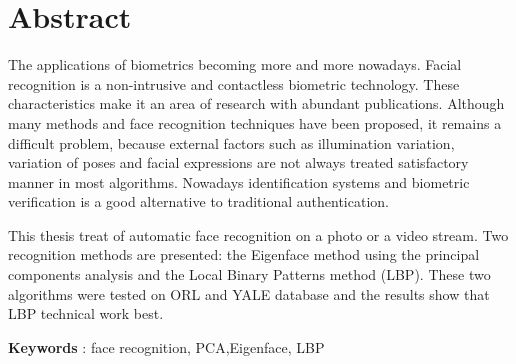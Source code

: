 \chapter*{Abstract}
The applications of biometrics becoming more and more nowadays. Facial recognition is a non-intrusive and contactless biometric technology. These characteristics make it an area of ​​research with abundant publications. Although many methods and face recognition techniques have been proposed, it remains a difficult problem, because external factors such as illumination variation, variation of poses and facial expressions are not always treated satisfactory manner in most algorithms. Nowadays identification systems and biometric verification is a good alternative to traditional authentication.

This thesis treat of automatic face recognition on a photo or a video stream. Two recognition methods are presented: the Eigenface method using the principal components analysis and the Local Binary Patterns method (LBP). These two algorithms were tested on ORL and YALE database and the results show that LBP technical work best.

\vspace{20pt}

\textbf{Keywords} : face recognition, PCA,Eigenface, LBP